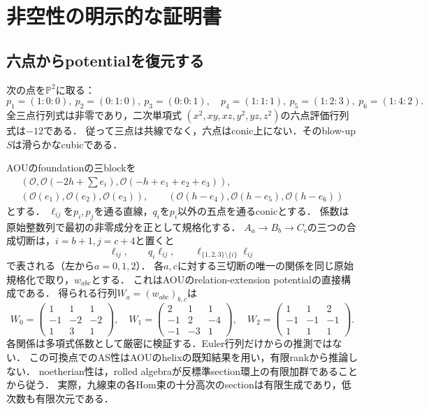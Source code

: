 \documentclass[11pt,a4paper]{ltjsarticle}
\theoremstyle{definition}\newtheorem{remark}[theorem]{注意}
\newcommand{\OO}{\mathcal O}\newcommand{\cA}{\mathcal A}\newcommand{\cB}{\mathcal B}
\begin{document}
\section{非空性の明示的な証明書}
\subsection{六点からpotentialを復元する}
次の点を$\mathbb P^2$に取る：
\[
 p_1=(1:0:0),\ p_2=(0:1:0),\ p_3=(0:0:1),\quad
 p_4=(1:1:1),\ p_5=(1:2:3),\ p_6=(1:4:2).
\]
全三点行列式は非零であり，二次単項式
$(x^2,xy,xz,y^2,yz,z^2)$の六点評価行列式は$-12$である．
従って三点は共線でなく，六点はconic上にない．そのblow-up $S$は滑らかなcubicである．

AOUのfoundationの三blockを
\[
 \begin{gathered}
 (\OO,\OO(-2h+\textstyle\sum e_i),\OO(-h+e_1+e_2+e_3)),\\
 (\OO(e_1),\OO(e_2),\OO(e_3)),\qquad
 (\OO(h-e_4),\OO(h-e_5),\OO(h-e_6))
 \end{gathered}
\]
とする\cite[(4.1)]{AOU}．
$\ell_{ij}$を$p_i,p_j$を通る直線，$q_i$を$p_i$以外の五点を通るconicとする．
係数は原始整数列で最初の非零成分を正として規格化する．
$A_a\to B_b\to C_c$の三つの合成切断は，$i=b+1,j=c+4$と置くと
\[
 \ell_{ij},\qquad q_i\ell_{ij},\qquad
 \ell_{\{1,2,3\}\setminus\{i\}}\ell_{ij}
\]
で表される（左から$a=0,1,2$）．
各$a,c$に対する三切断の唯一の関係を同じ原始規格化で取り，$w_{abc}$とする．
これはAOUのrelation-extension potentialの直接構成\cite[(4.7)]{AOU}である．
得られる行列$W_a=(w_{abc})_{b,c}$は
\begin{equation}\label{eq:witness}
 W_0=\begin{pmatrix}1&1&1\\-1&-2&-2\\1&3&1\end{pmatrix},\quad
 W_1=\begin{pmatrix}2&1&1\\-1&2&-4\\-1&-3&1\end{pmatrix},\quad
 W_2=\begin{pmatrix}1&1&2\\-1&-1&-1\\1&1&1\end{pmatrix}.
\end{equation}
各関係は多項式係数として厳密に検証する．Euler行列だけからの推測ではない．
この可換点でのAS性はAOUのhelixの既知結果を用い，有限rankから推論しない．
noetherian性は，rolled algebraが反標準section環上の有限加群であることから従う．
実際，九線束の各Hom束の十分高次のsectionは有限生成であり，低次数も有限次元である．
\end{document}
